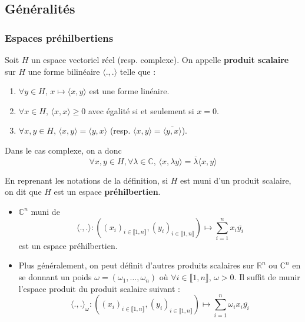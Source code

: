 




  \subsection{Généralités}

  \subsubsection{Espaces préhilbertiens}


  \begin{definition}
    Soit $H$ un espace vectoriel réel (resp. complexe). On appelle \textbf{produit scalaire} sur $H$ une forme bilinéaire $\langle . , . \rangle$ telle que :
    \begin{enumerate}[label={\bfseries(\roman*)}]
      \item $\forall y \in H, \, x \mapsto \langle x, y \rangle$ est une forme linéaire.
      \item $\forall x \in H, \, \langle x, x \rangle \geq 0$ avec égalité si et seulement si $x = 0$.
      \item $\forall x, y \in H, \, \langle x, y \rangle = \langle y, x \rangle$ (resp. $\langle x, y \rangle = \overline{\langle y, x \rangle}$).
    \end{enumerate}
  \end{definition}

  \begin{remark}
    Dans le cas complexe, on a donc
    \[ \forall x, y \in H, \forall \lambda \in \mathbb{C}, \, \langle x, \lambda y \rangle = \overline{\lambda} \langle x, y \rangle \]
  \end{remark}

  \begin{definition}
    En reprenant les notations de la définition, si $H$ est muni d'un produit scalaire, on dit que $H$ est un espace \textbf{préhilbertien}.
  \end{definition}

  \begin{example}
    \begin{itemize}
      \item $\mathbb{C}^n$ muni de
      \[ \langle ., . \rangle : ((x_i)_{i \in \llbracket 1, n \rrbracket},(y_i)_{i \in \llbracket 1, n \rrbracket}) \mapsto \sum_{i=1}^{n} x_i \overline{y_i} \]
      est un espace préhilbertien.
      \item Plus généralement, on peut définit d'autres produits scalaires sur $\mathbb{R}^n$ ou $\mathbb{C}^n$ en se donnant un poids $\omega = (\omega_1, \dots, \omega_n)$ où $\forall i \in \llbracket 1, n \rrbracket, \, \omega > 0$. Il suffit de munir l'espace produit du produit scalaire suivant :
      \[ \langle ., . \rangle_\omega : ((x_i)_{i \in \llbracket 1, n \rrbracket},(y_i)_{i \in \llbracket 1, n \rrbracket}) \mapsto \sum_{i=1}^{n} \omega_i x_i \overline{y_i} \]
    \end{itemize}
  \end{example}

